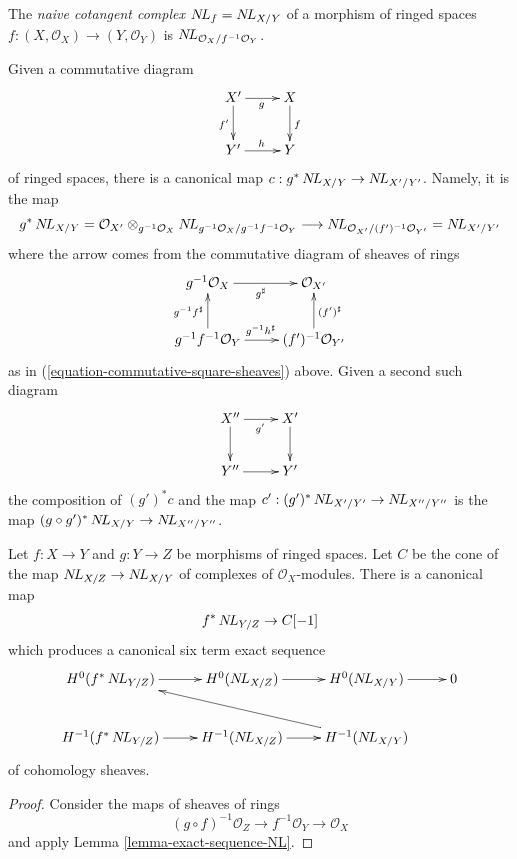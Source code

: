 \begin{definition}
\label{definition-cotangent-complex-morphism-ringed-topoi}
The {\it naive cotangent complex} $\mathop{N\!L}\nolimits_f = \mathop{N\!L}\nolimits_{X/Y}$ of a morphism of ringed
spaces $f : (X, \mathcal{O}_X) \to (Y, \mathcal{O}_Y)$ is
$\mathop{N\!L}\nolimits_{\mathcal{O}_X/f^{-1}\mathcal{O}_Y}$.
\end{definition}

\noindent
Given a commutative diagram
$$
\xymatrix{
X' \ar[r]_g \ar[d]_{f'} & X \ar[d]^f \\
Y' \ar[r]^h & Y
}
$$
of ringed spaces, there is a canonical map $c : g^*\mathop{N\!L}\nolimits_{X/Y} \to \mathop{N\!L}\nolimits_{X'/Y'}$.
Namely, it is the map
$$
g^*\mathop{N\!L}\nolimits_{X/Y} =
\mathcal{O}_{X'} \otimes_{g^{-1}\mathcal{O}_X}
\mathop{N\!L}\nolimits_{g^{-1}\mathcal{O}_X/g^{-1}f^{-1}\mathcal{O}_Y}
\longrightarrow
\mathop{N\!L}\nolimits_{\mathcal{O}_{X'}/(f')^{-1}\mathcal{O}_{Y'}} = \mathop{N\!L}\nolimits_{X'/Y'}
$$
where the arrow comes from the commutative diagram of sheaves of rings
$$
\xymatrix{
g^{-1}\mathcal{O}_X \ar[r]_{g^\sharp} &
\mathcal{O}_{X'} \\
g^{-1}f^{-1}\mathcal{O}_Y
\ar[r]^{g^{-1}h^\sharp}
\ar[u]^{g^{-1}f^\sharp} &
(f')^{-1}\mathcal{O}_{Y'} \ar[u]_{(f')^\sharp}
}
$$
as in (\ref{equation-commutative-square-sheaves}) above.
Given a second such diagram
$$
\xymatrix{
X'' \ar[r]_{g'} \ar[d] & X' \ar[d] \\
Y'' \ar[r] & Y'
}
$$
the composition of $(g')^*c$ and the map
$c' : (g')^*\mathop{N\!L}\nolimits_{X'/Y'} \to \mathop{N\!L}\nolimits_{X''/Y''}$
is the map $(g \circ g')^*\mathop{N\!L}\nolimits_{X/Y} \to \mathop{N\!L}\nolimits_{X''/Y''}$.

\begin{lemma}
\label{lemma-exact-sequence-NL-ringed-topoi}
Let $f : X \to Y$ and $g : Y \to Z$ be morphisms of ringed spaces.
Let $C$ be the cone of the map $\mathop{N\!L}\nolimits_{X/Z} \to \mathop{N\!L}\nolimits_{X/Y}$ of complexes
of $\mathcal{O}_X$-modules. There is a canonical map
$$
f^*\mathop{N\!L}\nolimits_{Y/Z} \to C[-1]
$$
which produces a canonical six term exact sequence
$$
\xymatrix{
H^0(f^*\NL_{Y/Z}) \ar[r] &
H^0(\NL_{X/Z}) \ar[r] &
H^0(\NL_{X/Y}) \ar[r] &
0 \\
H^{-1}(f^*\NL_{Y/Z}) \ar[r] &
H^{-1}(\NL_{X/Z}) \ar[r] &
H^{-1}(\NL_{X/Y}) \ar[llu]
}
$$
of cohomology sheaves.
\end{lemma}

\begin{proof}
Consider the maps of sheaves of rings
$$
(g \circ f)^{-1}\mathcal{O}_Z \to f^{-1}\mathcal{O}_Y \to \mathcal{O}_X
$$
and apply Lemma \ref{lemma-exact-sequence-NL}.
\end{proof}













